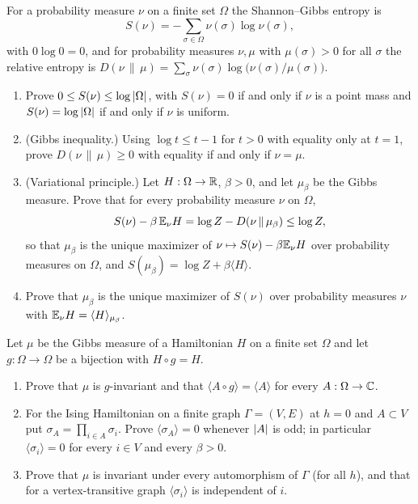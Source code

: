 \begin{exercise}
For a probability measure $\nu$ on a finite set $\Omega$ the Shannon--Gibbs
entropy is
\[
 S(\nu)=-\sum_{\sigma\in\Omega}\nu(\sigma)\log\nu(\sigma),
\]
with $0\log0=0$, and for probability measures $\nu,\mu$ with
$\mu(\sigma)>0$ for all $\sigma$ the relative entropy is
$D(\nu\,\|\,\mu)=\sum_\sigma\nu(\sigma)\log\bigl(\nu(\sigma)/\mu(\sigma)\bigr)$.
\begin{enumerate}[label=(\alph*)]
\item Prove $0\le S(\nu)\le\log\left\lvert \Omega\right\rvert$, with $S(\nu)=0$ if and only if
$\nu$ is a point mass and $S(\nu)=\log\left\lvert \Omega\right\rvert$ if and only if $\nu$ is
uniform.
\item (Gibbs inequality.)  Using $\log t\le t-1$ for $t>0$ with equality only
at $t=1$, prove $D(\nu\,\|\,\mu)\ge0$ with equality if and only if
$\nu=\mu$.
\item (Variational principle.)  Let $H:\Omega\to\mathbb R$, $\beta>0$, and let
$\mu_\beta$ be the Gibbs measure.  Prove that for every probability measure
$\nu$ on $\Omega$,
\[
 S(\nu)-\beta\,\mathbb E_\nu H=\log Z-D(\nu\,\|\,\mu_\beta)\le\log Z ,
\]
so that $\mu_\beta$ is the unique maximizer of $\nu\mapsto S(\nu)-\beta\mathbb E_\nu H$
over probability measures on $\Omega$, and $S(\mu_\beta)=\log Z+\beta\langle H\rangle$.
\item Prove that $\mu_\beta$ is the unique maximizer of $S(\nu)$ over
probability measures $\nu$ with $\mathbb E_\nu H=\langle H\rangle_{\mu_\beta}$.
\end{enumerate}
\end{exercise}

\begin{exercise}
Let $\mu$ be the Gibbs measure of a Hamiltonian $H$ on a finite set $\Omega$
and let $g:\Omega\to\Omega$ be a bijection with $H\circ g=H$.
\begin{enumerate}[label=(\alph*)]
\item Prove that $\mu$ is $g$-invariant and that
$\langle A\circ g\rangle=\langle A\rangle$ for every $A:\Omega\to\mathbb C$.
\item For the Ising Hamiltonian on a finite graph $\Gamma=(V,E)$ at $h=0$
and $A\subset V$ put $\sigma_A=\prod_{i\in A}\sigma_i$.  Prove
$\langle\sigma_A\rangle=0$ whenever $\left\lvert A\right\rvert$ is odd; in particular
$\langle\sigma_i\rangle=0$ for every $i\in V$ and every $\beta>0$.
\item Prove that $\mu$ is invariant under every automorphism of $\Gamma$ (for
all $h$), and that for a vertex-transitive graph
$\langle\sigma_i\rangle$ is independent of $i$.
\end{enumerate}
\end{exercise}

